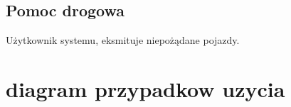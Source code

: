 \subsection{Pomoc drogowa}

Użytkownik systemu, eksmituje niepożądane pojazdy.

\newpage
\section{diagram przypadkow uzycia}
\begin{figure}
\vspace{-2cm}

\end{figure}

\newpage
